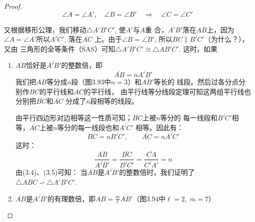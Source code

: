 \begin{proof}
\begin{equation}
    \angle A=\angle A',\quad \angle B=\angle B' \quad \Rightarrow\quad \angle C=\angle C'
\end{equation}
    
又根据移形公理，我们移动$\triangle A'B'C'$, 使$A'$与$A$重
合，$A'B'$落在$AB$上，因为$\angle A=\angle A'$所以$\overline{A'C'}$, 落在$\overline{AC}$
上。由于$\angle B=\angle B'$, 所以$BC\parallel B'C'$（为什么？），又由
三角形的全等条件（SAS）可知$\triangle A'B'C'\cong \triangle AB'C'$.
这时，如果

\begin{enumerate}
    \item $\overline{AB}$恰好是$\overline{A'B'}$的整数倍，即
\[\overline{AB}=n\overline{A'B'}\]
我们把$\overline{AB}$等分成$n$段（图3.93中$n=3$）和$\overline{AB'}$等长的
线段。然后过各分点分别作$BC$的平行线和$AC$的平行线，
由平行线等分线段定理可知这两组平行线也分别把$\overline{BC}$和$\overline{AC}$
分成了$n$段相等的线段。

由平行四边形对边相等这一性质可知；$\overline{BC}$上被$n$等分的
每一线段和$\overline{B'C'}$相等，$\overline{AC}$上被$n$等分的每一线段也和$\overline{A'C'}$
相等。因此有：
\[\overline{BC}=n\overline{B'C'},\qquad \overline{AC}=n\overline{A'C'}\]
这时：
\begin{equation}
    \frac{\overline{AB}}{\overline{A'B'}}=\frac{\overline{BC}}{\overline{B'C'}}=\frac{\overline{CA}}{\overline{C'A'}}=n
\end{equation}
由(3.4)、(3.5)可知：
当$\overline{AB}$是$\overline{A'B'}$的整数倍时，我们证明了
$\triangle ABC\backsim \triangle A'B'C'$.
\item $\overline{AB}$是$\overline{A'B'}$的有理数倍，即$\overline{AB}=\frac{m}{\ell}\overline{AB'}$（图3.94中$\ell=2,\; m=7$）

\begin{figure}[htp]
    \centering
{}
    \caption{}
\end{figure}



\end{enumerate}
\end{proof}
